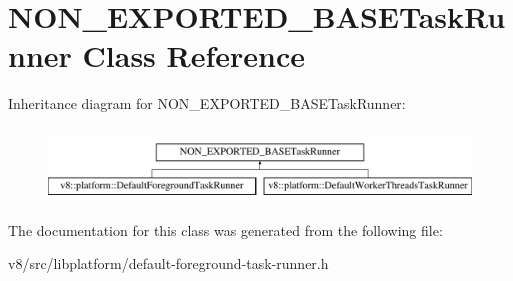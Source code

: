 \hypertarget{classNON__EXPORTED__BASETaskRunner}{}\section{N\+O\+N\+\_\+\+E\+X\+P\+O\+R\+T\+E\+D\+\_\+\+B\+A\+S\+E\+Task\+Runner Class Reference}
\label{classNON__EXPORTED__BASETaskRunner}
Inheritance diagram for N\+O\+N\+\_\+\+E\+X\+P\+O\+R\+T\+E\+D\+\_\+\+B\+A\+S\+E\+Task\+Runner\+:\begin{figure}[H]
\begin{center}
\leavevmode
\includegraphics[height=1.964912cm]{classNON__EXPORTED__BASETaskRunner}
\end{center}
\end{figure}


The documentation for this class was generated from the following file\+:\begin{DoxyCompactItemize}
\item 
v8/src/libplatform/default-\/foreground-\/task-\/runner.\+h\end{DoxyCompactItemize}

